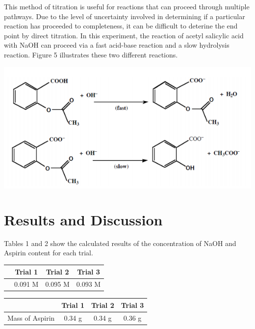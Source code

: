 \documentclass{article}
\begin{document}
This method of titration is useful for reactions that can proceed through multiple
pathways. Due to the level of uncertainty involved in determining if a particular reaction has
proceeded to completeness, it can be difficult to deterine the end point by direct
titration.\cite{lab_man} In this experiment, the reaction of acetyl salicylic acid with NaOH can
proceed via a fast acid-base reaction and a slow hydrolysis reaction. Figure 5 illustrates these
two different reactions.

\begin{center}
        \includegraphics[scale=0.5]{aspirin_rxn}
\end{center}

\newpage

\section {Results and Discussion}

Tables 1 and 2 show the calculated results of the concentration of NaOH and Aspirin content for each
trial.
\begin{center}
        \begin{tabular}{ |c|c|c|c| }
                \hline
                & Trial 1 & Trial 2 & Trial 3 \\
                \hline
                [NaOH] & 0.091 M & 0.095 M & 0.093 M \\
                \hline
        \end{tabular}
        \vspace{1cm}

        \begin{tabular}{ |c|c|c|c| }
                \hline
                & Trial 1 & Trial 2 & Trial 3 \\
                \hline
                Mass of Aspirin & 0.34 g & 0.34 g & 0.36 g \\ 
                \hline
        \end{tabular}
\end{center}
\end{document}
